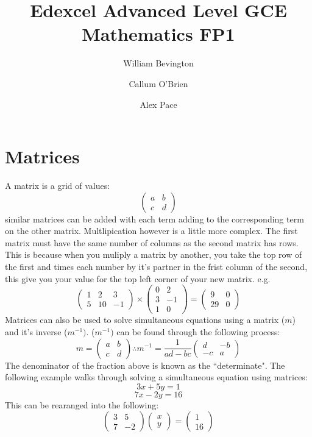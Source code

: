 \documentclass{article}
\title{Edexcel Advanced Level GCE Mathematics FP1}
\author{William Bevington \and Callum O'Brien \and Alex Pace}
\date{}
\begin{document}
\maketitle
\tableofcontents
\newpage

\section{Matrices}
A matrix is a grid of values:
\[\left(\begin{array}{cc} a & b \\ c & d \end{array}\right)\]
similar matrices can be added with each term adding to the corresponding term on the other matrix. Multlipication however is a little more complex. The first matrix must have the same number of columns as the second matrix has rows. This is because when you muliply a matrix by another, you take the top row of the first and times each number by it's partner in the frist column of the second, this give you your value for the top left corner of your new matrix. e.g.
\[\left(\begin{array}{ccc} 1 & 2 & 3 \\ 5 & 10 & -1 \end{array}\right) \times \left(\begin{array}{cc} 0 & 2 \\ 3 & -1 \\ 1 & 0 \end{array}\right) = \left(\begin{array}{cc} 9 & 0 \\ 29 & 0 \end{array}\right)\]
Matrices can also be used to solve simultaneous equations using a matrix (\(m\)) and it's inverse (\(m^{-1})\). (\(m^{-1})\) can be found through the following process:
\[m=\left(\begin{array}{cc} a & b \\ c & d \end{array}\right) \therefore m^{-1} = \frac{1}{ad-bc}\left(\begin{array}{cc} d & -b \\ -c & a \end{array}\right)\]
The denominator of the fraction above is known as the ``determinate". The following example walks through solving a simultaneous equation using matrices:
\[3x+5y=1\]
\[7x-2y=16\]
This can be rearanged into the following:
\[\left(\begin{array}{cc} 3 & 5 \\ 7 & -2 \end{array}\right)\left(\begin{array}{c} x \\ y \end{array}\right)=\left(\begin{array}{c} 1 \\ 16 \end{array}\right)\]
\end{document}
